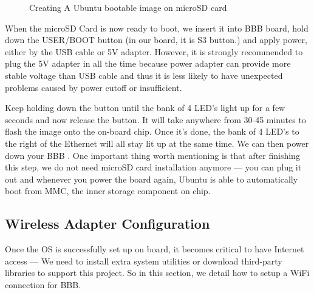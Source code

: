 \documentclass[12pt,journal,draftclsnofoot,onecolumn]{IEEEtran}
\begin{document}
\begin{figure}[htb]
	\centering
     \caption{Creating A Ubuntu bootable image on microSD card}
     \end{figure}

When the microSD Card is now ready to boot, we insert it into BBB board, hold down the USER/BOOT button (in our board, it is S3 button.) and apply power, either by the USB cable or 5V adapter. However, it is strongly recommended to plug the 5V adapter in all the time because power adapter can provide more stable voltage than USB cable and thus it is less likely to have unexpected problems caused by power cutoff or insufficient.

Keep holding down the button until  the bank of 4 LED's light up for a few seconds and now release the button.
It will take anywhere from 30-45 minutes to flash the image onto the on-board chip. Once it's done, the bank of 4 LED's to the right of the Ethernet will all stay lit up at the same time. We can then power down your BBB \cite{flashBB}. One important thing worth mentioning is that after finishing this step, we do not need microSD card installation anymore --- you can plug it out and whenever you power the board again, Ubuntu is able to automatically boot from MMC, the inner storage component on chip.
	
\subsection{Wireless Adapter Configuration}\label{Wireless}
Once the OS is successfully set up on board, it becomes critical to have Internet access --- We need to install extra system utilities or download third-party libraries to support this project. So in this section, we detail how to setup a WiFi connection for BBB.
\end{document}
